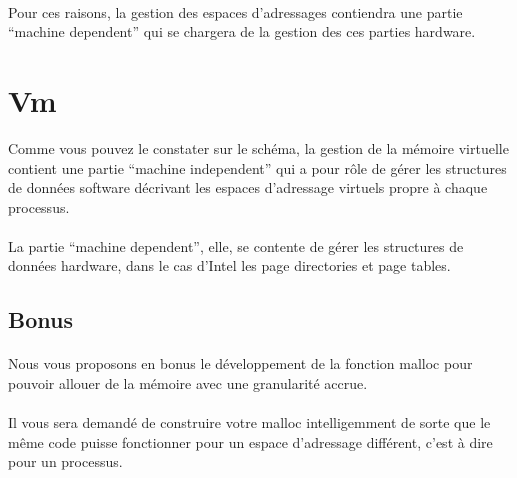 \documentclass[10pt,a4wide]{article}
\begin{document}
\paragraph{}

Pour ces raisons, la gestion des espaces d'adressages contiendra une partie
``machine dependent'' qui se chargera de la gestion des ces parties hardware.

\section{Vm}

Comme vous pouvez le constater sur le sch\'ema, la gestion de la m\'emoire
virtuelle contient une partie ``machine independent'' qui a pour r\^ole
de g\'erer les structures de donn\'ees software d\'ecrivant les espaces
d'adressage virtuels propre \`a chaque processus.

\paragraph{}

La partie ``machine dependent'', elle, se contente de g\'erer les structures
de donn\'ees hardware, dans le cas d'Intel les page directories et page
tables.

\subsection{Bonus}

\paragraph{}

Nous vous proposons en bonus le d\'eveloppement de la fonction malloc
pour pouvoir allouer de la m\'emoire avec une granularit\'e accrue.

\paragraph{}

Il vous sera demand\'e de construire votre malloc intelligemment de sorte
que le m\^eme code puisse fonctionner pour un espace d'adressage diff\'erent,
c'est \`a dire pour un processus.
\end{document}
